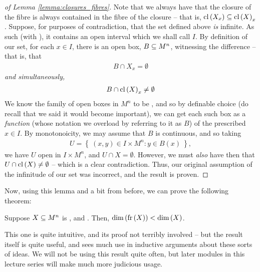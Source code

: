 \begin{proof}[of Lemma \ref{lemma:closures_fibres}]
  Note that we always have that the closure of the fibre is always contained in the fibre of the closure -- that is, $\cl{X_x} \subseteq \cl{X}_x$. Suppose, for purposes of contradiction, that the set defined above \emph{is} infinite. As such (with ), it contains an open interval which we shall call $I$. By definition of our set, for each $x \in I$, there is an open box, $\XMn[B]{n}$, witnessing the difference -- that is, that
    \begin{align*}
     B \cap X_x = \emptyset
    \end{align*}
  \emph{and simultaneously,}
    \begin{align*}
      B \cap \cl{X}_x \neq \emptyset
    \end{align*}
  We know the family of open boxes in $M^n$ to be , and so by definable choice (do recall that we said it would become important), we can get each such box as a \emph{ function} (whose notation we overload by referring to it as $B$) of the prescribed $x \in I$. By monotonoicity, we may assume that $B$ is continuous, and so taking
    \begin{align*}
      U = \left\{ \ (x, y) \in I \times M^n \colon y \in B(x) \ \right\},
    \end{align*}
  we have $U$ open in $I \times M^n$, and $U \cap X = \emptyset$. However, we must \emph{also} have then that $U \cap \cl{X} \neq \emptyset$ -- which is a clear contradiction. Thus, our original assumption of the infinitude of our set was incorrect, and the result is proven.
\end{proof}

Now, using this lemma and a bit from before, we can prove the following theorem:

\begin{theorem}
  \label{thm:fr_dim}
  Suppose $\XMn{n}$ is \inhb, and . Then, $\dim{\fr{X}} < \dim{X}$.
\end{theorem}

This one is quite intuitive, and its proof not terribly involved -- but the result itself is quite useful, and sees much use in inductive arguments about these sorts of ideas. We will not be using this result quite often, but later modules in this lecture series will make much more judicious usage.

